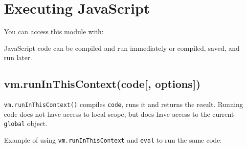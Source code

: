 \section{Executing JavaScript}\label{executing-javascript}

\begin{Shaded}
\begin{Highlighting}[]
 
\end{Highlighting}
\end{Shaded}

You can access this module with:

\begin{Shaded}
\begin{Highlighting}[]
 \NormalTok{(}\NormalTok{);}
\end{Highlighting}
\end{Shaded}

JavaScript code can be compiled and run immediately or compiled, saved,
and run later.

\subsection{vm.runInThisContext(code{[},
options{]})}\label{vm.runinthiscontextcode-options}

\texttt{vm.runInThisContext()} compiles \texttt{code}, runs it and
returns the result. Running code does not have access to local scope,
but does have access to the current \texttt{global} object.

Example of using \texttt{vm.runInThisContext} and \texttt{eval} to run
the same code:

\begin{Shaded}
\begin{Highlighting}[]
 \NormalTok{;}

 \NormalTok{(}\NormalTok{);}
\NormalTok{(}
\NormalTok{(}

 \NormalTok{(}\NormalTok{);}
\NormalTok{(}
\NormalTok{(}

\end{Highlighting}
\end{Shaded}

